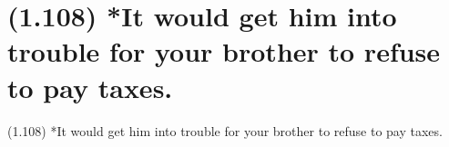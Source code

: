 \documentclass{article}
\begin{document}
\clearpage

%
%

\section*{(1.108) *It would get him into trouble for your brother to refuse to pay taxes.}

\bigbreak
\begin{enumerate*}
\item[(1.108)] *It would get him into trouble for your brother to refuse to pay taxes.
\end{enumerate*}
\bigbreak
\end{document}
